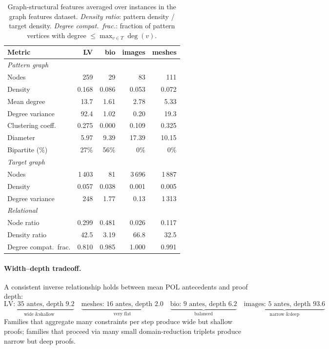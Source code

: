 \documentclass[11pt,a4paper]{article}
\begin{document}
\begin{table}[h]
\centering
\renewcommand{\arraystretch}{1.15}
\begin{tabular}{lrrrr}
\toprule
Metric & LV & bio & images & meshes \\
\midrule
\multicolumn{5}{l}{\emph{Pattern graph}} \\
\quad Nodes                 & 259 &  29 &  83 & 111 \\
\quad Density               & 0.168 & 0.086 & 0.053 & 0.072 \\
\quad Mean degree           & 13.7 & 1.61 & 2.78 & 5.33 \\
\quad Degree variance       & 92.4 & 1.02 & 0.20 & 19.3 \\
\quad Clustering coeff.     & 0.275 & 0.000 & 0.109 & 0.325 \\
\quad Diameter              &  5.97 & 9.39 & 17.39 & 10.15 \\
\quad Bipartite (\%)        & 27\% & 56\% & 0\% & 0\% \\
\midrule
\multicolumn{5}{l}{\emph{Target graph}} \\
\quad Nodes                 & 1\,403 &  81 & 3\,696 & 1\,887 \\
\quad Density               & 0.057 & 0.038 & 0.001 & 0.005 \\
\quad Degree variance       & 248 & 1.77 & 0.13 & 1\,313 \\
\midrule
\multicolumn{5}{l}{\emph{Relational}} \\
\quad Node ratio            & 0.299 & 0.481 & 0.026 & 0.117 \\
\quad Density ratio         &  42.5 &  3.19 & 66.8 &  32.5 \\
\quad Degree compat.\ frac. & 0.810 & 0.985 & 1.000 & 0.991 \\
\bottomrule
\end{tabular}
\caption{Graph-structural features averaged over instances in the graph features dataset.
\emph{Density ratio}: pattern density / target density.
\emph{Degree compat.\ frac.}: fraction of pattern vertices with degree $\le \max_{v \in T}\deg(v)$.}
\label{tab:graph-features}
\end{table}

\paragraph{Width--depth tradeoff.}
A consistent inverse relationship holds between mean POL antecedents and proof depth:
\[
  \underbrace{\text{LV: 35 antes, depth 9.2}}_{\text{wide \& shallow}}
  \quad
  \underbrace{\text{meshes: 16 antes, depth 2.0}}_{\text{very flat}}
  \quad
  \underbrace{\text{bio: 9 antes, depth 6.2}}_{\text{balanced}}
  \quad
  \underbrace{\text{images: 5 antes, depth 93.6}}_{\text{narrow \& deep}}
\]
Families that aggregate many constraints per step produce wide but shallow proofs;
families that proceed via many small domain-reduction triplets produce narrow but deep proofs.
\end{document}
